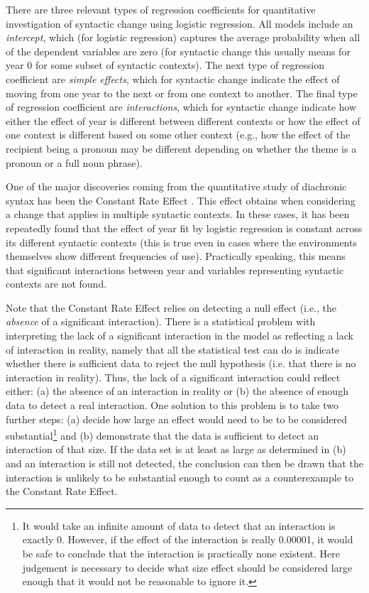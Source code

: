 	There are three relevant types of regression coefficients for quantitative investigation of syntactic change using logistic regression. All models include an \textit{intercept}, which (for logistic regression) captures the average probability when all of the dependent variables are zero (for syntactic change this usually means for year 0 for some subset of syntactic contexts). The next type of regression coefficient are \textit{simple effects}, which for syntactic change indicate the effect of moving from one year to the next or from one context to another. The final type of regression coefficient are \textit{interactions}, which for syntactic change indicate how either the effect of year is different between different contexts or how the effect of one context is different based on some other context (e.g., how the effect of the recipient being a pronoun may be different depending on whether the theme is a pronoun or a full noun phrase).

	One of the major discoveries coming from the quantitative study of diachronic syntax has been the Constant Rate Effect \citep{Kroch.1989,Kroch.1994}. This effect obtains when considering a change that applies in multiple syntactic contexts. In these cases, it has been repeatedly found that the effect of year fit by logistic regression is constant across its different syntactic contexts (this is true even in cases where the environments themselves show different frequencies of use). Practically speaking, this means that significant interactions between year and variables representing syntactic contexts are not found.

	Note that the Constant Rate Effect relies on detecting a null effect (i.e., the \textit{absence} of a significant interaction). There is a statistical problem with interpreting the lack of a significant interaction in the model as reflecting a lack of interaction in reality, namely that all the statistical test can do is indicate whether there is sufficient data to reject the null hypothesis (i.e. that there is no interaction in reality). Thus, the lack of a significant interaction could reflect either: (a) the absence of an interaction in reality or (b) the absence of enough data to detect a real interaction. One solution to this problem is to take two further steps: (a) decide how large an effect would need to be to be considered substantial\footnote{It would take an infinite amount of data to detect that an interaction is exactly 0. However, if the effect of the interaction is really 0.00001, it would be safe to conclude that the interaction is practically none existent. Here judgement is necessary to decide what size effect should be considered large enough that it would not be reasonable to ignore it.} and (b) demonstrate that the data is sufficient to detect an interaction of that size. If the data set is at least as large as determined in (b) and an interaction is still not detected, the conclusion can then be drawn that the interaction is unlikely to be substantial enough to count as a counterexample to the Constant Rate Effect.

